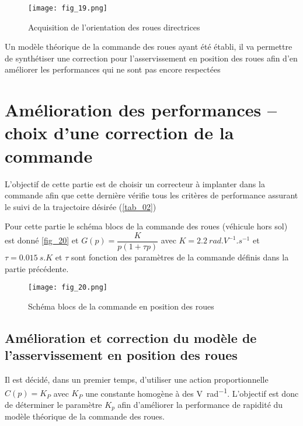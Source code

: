 \begin{figure}[H]
\centering
\texttt{[image: fig\_19.png]}
\caption{Acquisition de l’orientation des roues directrices \label{fig_19}}
\end{figure}


Un modèle théorique de la commande des roues ayant été établi, il va permettre de synthétiser une correction
pour l’asservissement en position des roues afin d’en améliorer les performances qui ne sont pas encore respectées

\section{Amélioration des performances  -- choix d’une correction de la
commande}
\begin{obj}
L’objectif de cette partie est de choisir un correcteur à implanter dans la commande afin que cette
dernière vérifie tous les critères de performance assurant le suivi de la trajectoire désirée (\autoref{tab_02})
\end{obj}

Pour cette partie le schéma blocs de la commande des roues (véhicule hors sol) est donné \autoref{fig_20} et $G(p) = \dfrac{K}{p\left(1+\tau p\right)}$  avec $K = \SI{2,2}{rad.V^{-1}.s^{-1}}$ et $\tau = \SI{0,015}{s}$.$K$ et $\tau$ sont fonction des paramètres de la commande définis dans la partie précédente.


\begin{figure}[H]
\centering
\texttt{[image: fig\_20.png]}
\caption{Schéma blocs de la commande en position des roues \label{fig_20}}
\end{figure}


\subsection{Amélioration et correction du modèle de l’asservissement en position des roues}
Il est décidé, dans un premier temps, d’utiliser une action proportionnelle $C(p)=K_P$ avec $K_P$ une constante
homogène à des \si{V.rad^{-1}}. L’objectif est donc de déterminer le paramètre $K_p$ afin d’améliorer la performance de rapidité du modèle théorique de la commande des roues.

